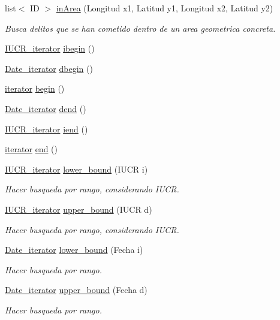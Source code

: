 \begin{DoxyCompactItemize}
list$<$ I\+D $>$ \hyperlink{classCSS_a8a38d465d1886a86d22b6fc365fd8345}{in\+Area} (Longitud x1, Latitud y1, Longitud x2, Latitud y2)
\begin{DoxyCompactList}\small\item\em Busca delitos que se han cometido dentro de un area geometrica concreta. \end{DoxyCompactList}\item 
\hyperlink{classCSS_1_1IUCR__iterator}{I\+U\+C\+R\+\_\+iterator} \hyperlink{classCSS_adb1e966261184762b82cd74ea184cb04}{ibegin} ()
\item 
\hyperlink{classCSS_1_1Date__iterator}{Date\+\_\+iterator} \hyperlink{classCSS_a800a8614ae299a41344c211b43efa943}{dbegin} ()
\item 
\hyperlink{classCSS_1_1iterator}{iterator} \hyperlink{classCSS_acd70d4445614dba24d9a5363f91099ad}{begin} ()
\item 
\hyperlink{classCSS_1_1Date__iterator}{Date\+\_\+iterator} \hyperlink{classCSS_a4c49f628d97d7a94268103228b3f33c1}{dend} ()
\item 
\hyperlink{classCSS_1_1IUCR__iterator}{I\+U\+C\+R\+\_\+iterator} \hyperlink{classCSS_a3c53e356a8571df813ce80f90478023a}{iend} ()
\item 
\hyperlink{classCSS_1_1iterator}{iterator} \hyperlink{classCSS_a1068ab0d435e4cf0ad494df8102240b8}{end} ()
\item 
\hyperlink{classCSS_1_1IUCR__iterator}{I\+U\+C\+R\+\_\+iterator} \hyperlink{classCSS_a5f79c3fd84197d0a0f865bff08a049a6}{lower\+\_\+bound} (I\+U\+C\+R i)
\begin{DoxyCompactList}\small\item\em Hacer busqueda por rango, considerando I\+U\+C\+R. \end{DoxyCompactList}\item 
\hyperlink{classCSS_1_1IUCR__iterator}{I\+U\+C\+R\+\_\+iterator} \hyperlink{classCSS_a5005ab25a8151e21aaeaa066f63394c0}{upper\+\_\+bound} (I\+U\+C\+R d)
\begin{DoxyCompactList}\small\item\em Hacer busqueda por rango, considerando I\+U\+C\+R. \end{DoxyCompactList}\item 
\hyperlink{classCSS_1_1Date__iterator}{Date\+\_\+iterator} \hyperlink{classCSS_a9d22cb90961cb7b74946ec256328f469}{lower\+\_\+bound} (Fecha i)
\begin{DoxyCompactList}\small\item\em Hacer busqueda por rango. \end{DoxyCompactList}\item 
\hyperlink{classCSS_1_1Date__iterator}{Date\+\_\+iterator} \hyperlink{classCSS_a45e406f1706277a2c39d54e5a5f77f48}{upper\+\_\+bound} (Fecha d)
\begin{DoxyCompactList}\small\item\em Hacer busqueda por rango. \end{DoxyCompactList}\end{DoxyCompactItemize}


